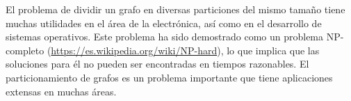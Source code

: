 El problema de dividir un grafo en diversas particiones del mismo tamaño tiene muchas utilidades en el área de la electrónica, así como en el desarrollo de sistemas operativos. Este problema ha sido demostrado como un problema NP-completo (\url{https://es.wikipedia.org/wiki/NP-hard}), lo que implica que las soluciones para él no pueden ser encontradas en tiempos razonables. El particionamiento de grafos es un problema importante que tiene aplicaciones extensas en muchas áreas.